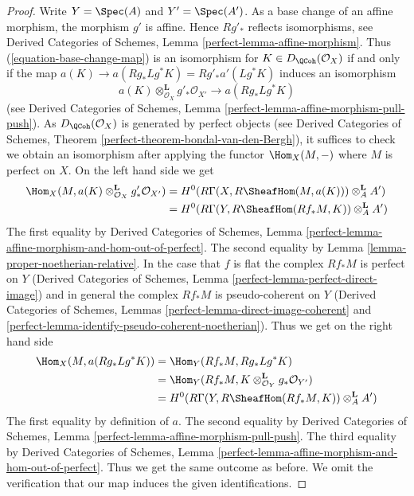 \begin{proof}
Write $Y = \Spec(A)$ and $Y' = \Spec(A')$. As a base change of an affine
morphism, the morphism $g'$ is affine. Hence $Rg'_*$ reflects isomorphisms,
see Derived Categories of Schemes, Lemma \ref{perfect-lemma-affine-morphism}.
Thus (\ref{equation-base-change-map}) is an isomorphism for
$K \in D_\QCoh(\mathcal{O}_X)$ if and only
if the map $a(K) \to a(Rg_*Lg^*K) = Rg'_*a'(Lg^*K)$ induces an isomorphism
$$
a(K) \otimes^\mathbf{L}_{\mathcal{O}_X} g'_*\mathcal{O}_{X'} \to a(Rg_*Lg^*K)
$$
(see Derived Categories of Schemes, Lemma
\ref{perfect-lemma-affine-morphism-pull-push}).
As $D_\QCoh(\mathcal{O}_X)$ is generated by perfect objects
(see Derived Categories of Schemes, Theorem
\ref{perfect-theorem-bondal-van-den-Bergh}), it suffices
to check we obtain an isomorphism after applying the functor
$\Hom_X(M, -)$ where $M$ is perfect on $X$. On the left hand side
we get
\begin{align*}
\Hom_X(M, a(K) \otimes^\mathbf{L}_{\mathcal{O}_X} g'_*\mathcal{O}_{X'})
& =
H^0(R\Gamma(X, R\SheafHom(M, a(K))) \otimes^\mathbf{L}_A A') \\
& =
H^0(R\Gamma(Y, R\SheafHom(Rf_*M, K)) \otimes^\mathbf{L}_A A')
\end{align*}
The first equality by Derived Categories of Schemes,
Lemma \ref{perfect-lemma-affine-morphism-and-hom-out-of-perfect}.
The second equality by Lemma \ref{lemma-proper-noetherian-relative}.
In the case that $f$ is flat the complex $Rf_*M$ is perfect on $Y$
(Derived Categories of Schemes, Lemma \ref{perfect-lemma-perfect-direct-image})
and in general the complex $Rf_*M$ is pseudo-coherent on $Y$
(Derived Categories of Schemes, Lemmas
\ref{perfect-lemma-direct-image-coherent} and
\ref{perfect-lemma-identify-pseudo-coherent-noetherian}).
Thus we get on the right hand side
\begin{align*}
\Hom_X(M, a(Rg_*Lg^*K))
& =
\Hom_Y(Rf_*M, Rg_*Lg^*K) \\
& =
\Hom_Y(Rf_*M, K \otimes^\mathbf{L}_{\mathcal{O}_Y} g_*\mathcal{O}_{Y'}) \\
& =
H^0(R\Gamma(Y, R\SheafHom(Rf_*M, K)) \otimes_A^\mathbf{L} A')
\end{align*}
The first equality by definition of $a$. The second equality
by Derived Categories of Schemes, Lemma
\ref{perfect-lemma-affine-morphism-pull-push}.
The third equality by Derived Categories of Schemes,
Lemma \ref{perfect-lemma-affine-morphism-and-hom-out-of-perfect}.
Thus we get the same outcome as before. We omit the
verification that our map induces the given identifications.
\end{proof}

